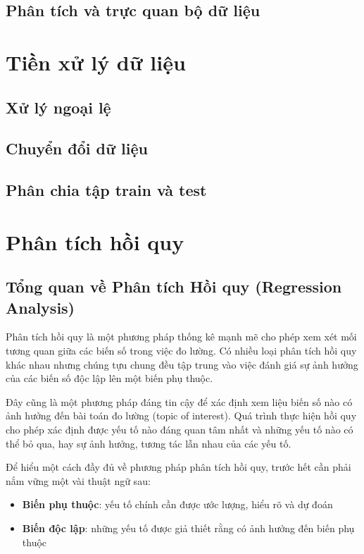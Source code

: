 \documentclass[runningheads]{llncs}
\begin{document}
\subsection{Phân tích và trực quan bộ dữ liệu}

\section{Tiền xử lý dữ liệu}

\subsection{Xử lý ngoại lệ}

\subsection{Chuyển đổi dữ liệu}

\subsection{Phân chia tập train và test}

\section{Phân tích hồi quy}

\subsection{Tổng quan về Phân tích Hồi quy (Regression Analysis)}
Phân tích hồi quy là một phương pháp thống kê mạnh mẽ cho phép xem xét mối tương quan giữa các biến số trong việc đo lường. Có nhiều loại phân tích hồi quy khác nhau nhưng chúng tựu chung đều tập trung vào việc đánh giá sự ảnh hưởng của các biến số độc lập lên một biến phụ thuộc.

Đây cũng là một phương pháp đáng tin cậy để xác định xem liệu biến số nào có ảnh hưởng đến bài toán đo lường (topic of interest). Quá trình thực hiện hồi quy cho phép xác định được yếu tố nào đáng quan tâm nhất và những yếu tố nào có thể bỏ qua, hay sự ảnh hưởng, tương tác lẫn nhau của các yếu tố.

Để hiểu một cách đầy đủ về phương pháp phân tích hồi quy, trước hết cần phải nắm vững một vài thuật ngữ sau:
\begin{itemize}
	\item \textbf{Biến phụ thuộc}: yếu tố chính cần được ước lượng, hiểu rõ và dự đoán 
	\item \textbf{Biến độc lập}: những yếu tố được giả thiết rằng có ảnh hưởng đến biến phụ thuộc
\end{itemize}
\end{document}

